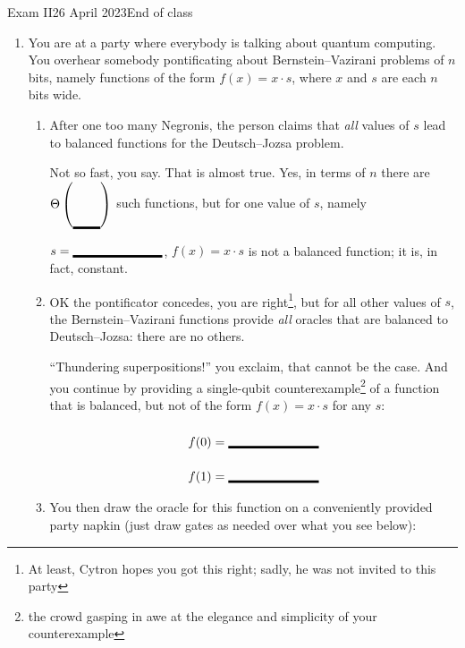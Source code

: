 \documentclass[12pt]{article}
\newcommand{\Blank}[1][1in]{\mbox{\vrule width #1 depth 2pt}\vrule width 0pt height 2.0em}
\begin{document}
\begin{assignment}{Exam II}{26 April 2023}{End of class}
\begin{enumerate}
\begin{enumerate}
    \item This is an instance of Grover for a function, where the input values are \Blank{} bits wide.
    \item From $\ket{\psi_{f}}$ shown above, what is the secret  (the input value that Grover is trying to find)?~\Blank{}
    \item This is the first step of the \Blank{} iteration of the algorithm.
    \item When we complete this iteration by performing diffusion, the amplitude on  will be approximately \Blank{}, because it increases each iteration on a problem of this size by approximately~\Blank{}.
    
    
\end{enumerate}

\clearpage\item{} You are at a party where everybody is talking about quantum computing.  You overhear somebody pontificating about Bernstein--Vazirani problems of $n$ bits, namely functions of the form
\( f(x) = x \cdot s \),
where $x$ and $s$ are each $n$ bits wide.  

\begin{enumerate}
\item{} After one too many Negronis, the person claims that \emph{all} values of $s$ lead to balanced functions for the Deutsch--Jozsa problem.

Not so fast, you say.  That is almost true.  Yes, in terms of $n$ there are $\Theta\left(\mbox{\vrule width 0pt height 2em depth 0pt\raisebox{-1.5em}{\Blank[2.2em]}}\right)$ such functions, but for one value of $s$, namely $s=\Blank{}$, $f(x)=x\cdot s$ is not a balanced function; it is, in fact, constant.

\item{} OK the pontificator concedes, you are right\footnote{At least, Cytron hopes you got this right; sadly, he was not invited to this party}, but for all other values of $s$, the Bernstein--Vazirani functions provide \emph{all} oracles that are balanced to Deutsch--Jozsa: there are no others.

``Thundering superpositions!'' you exclaim, that cannot be the case.  And you continue by providing a single-qubit counterexample\footnote{the crowd gasping in awe at the elegance and simplicity of your counterexample} of a function that is balanced, but not of the form $f(x)=x\cdot s$ for any $s$:
\begin{align*}
    f(0) &= \Blank{} \\
    f(1) &= \Blank{}
\end{align*}
\item{} You then draw the oracle for this function on a conveniently provided party napkin (just draw gates as needed over what you see below):


\end{enumerate}
\end{enumerate}
\end{assignment}
\end{document}
